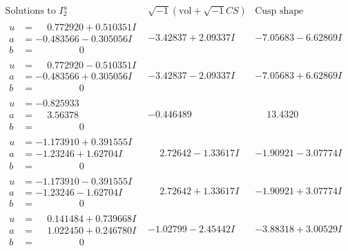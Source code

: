 \documentclass[1p]{elsarticle_modified}
\theoremstyle{definition}
\newcommand{\I}{\sqrt{-1}}
\begin{document}
$$\begin{array}{c|c|c}  
\text{Solutions to }I^u_{2}& \I (\text{vol} + \sqrt{-1}CS) & \text{Cusp shape}\\
 \hline 
\begin{aligned}
u &= \phantom{-}0.772920 + 0.510351 I \\
a &= -0.483566 - 0.305056 I \\
b &= \phantom{-0.000000 } 0\end{aligned}
 & -3.42837 + 2.09337 I & -7.05683 - 6.62869 I \\ \hline\begin{aligned}
u &= \phantom{-}0.772920 - 0.510351 I \\
a &= -0.483566 + 0.305056 I \\
b &= \phantom{-0.000000 } 0\end{aligned}
 & -3.42837 - 2.09337 I & -7.05683 + 6.62869 I \\ \hline\begin{aligned}
u &= -0.825933\phantom{ +0.000000I} \\
a &= \phantom{-}3.56378\phantom{ +0.000000I} \\
b &= \phantom{-0.000000 } 0\end{aligned}
 & -0.446489\phantom{ +0.000000I} & \phantom{-}13.4320\phantom{ +0.000000I} \\ \hline\begin{aligned}
u &= -1.173910 + 0.391555 I \\
a &= -1.23246 + 1.62704 I \\
b &= \phantom{-0.000000 } 0\end{aligned}
 & \phantom{-}2.72642 - 1.33617 I & -1.90921 - 3.07774 I \\ \hline\begin{aligned}
u &= -1.173910 - 0.391555 I \\
a &= -1.23246 - 1.62704 I \\
b &= \phantom{-0.000000 } 0\end{aligned}
 & \phantom{-}2.72642 + 1.33617 I & -1.90921 + 3.07774 I \\ \hline\begin{aligned}
u &= \phantom{-}0.141484 + 0.739668 I \\
a &= \phantom{-}1.022450 + 0.246780 I \\
b &= \phantom{-0.000000 } 0\end{aligned}
 & -1.02799 - 2.45442 I & -3.88318 + 3.00529 I \\ \hline\begin{aligned}

\end{aligned}
\end{array}$$
\end{document}
